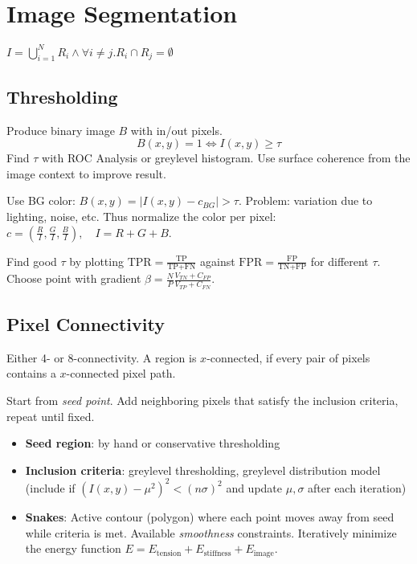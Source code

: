 \section{Image Segmentation}
\begin{definition}
  \(I = \bigcup_{i=1}^N R_i \land \forall i \neq j. R_i \cap R_j = \emptyset\)
\end{definition}

\subsection{Thresholding}

\begin{algorithm}[Thresholding]
  Produce binary image \(B\) with in/out pixels.
  \[B(x, y) = 1  \iff I(x, y) \geq \tau\]
  Find \(\tau\) with ROC Analysis or greylevel histogram. Use surface coherence from the image context to improve result.
\end{algorithm}

\begin{algorithm}[Chromakeying]
  Use BG color: \(B(x, y) = |I(x, y) - c_{BG}| > \tau\).
  Problem: variation due to lighting, noise, etc.
  Thus normalize the color per pixel: \(c = (\frac{R}{I}, \frac{G}{I}, \frac{B}{I}), \quad I = R + G + B\).
\end{algorithm}

\begin{definition}
  Find good \(\tau\) by plotting \(\text{TPR} = \frac{\text{TP}}{\text{TP} + \text{FN}}\) against \(\text{FPR} = \frac{\text{FP}}{\text{TN} + \text{FP}}\) for different \(\tau\). 
  Choose point with gradient \(\beta = \frac{N}{P} \frac{V_{TN} + C_{FP}}{V_{TP} + C_{FN}}\).
\end{definition}

\subsection{Pixel Connectivity}
Either 4- or 8-connectivity. A region is \(x\)-connected, if every pair of pixels contains a \(x\)-connected pixel path.

\begin{algorithm}
  Start from \textit{seed point}. Add neighboring pixels that satisfy the inclusion criteria, repeat until fixed.

  \begin{itemize}
    \item \textbf{Seed region}: by hand or conservative thresholding
    \item \textbf{Inclusion criteria}: greylevel thresholding, greylevel distribution model (include if \((I(x, y) - \mu^2)^2 < (n \sigma)^2\) and update \(\mu, \sigma\) after each iteration)
    \item \textbf{Snakes}: Active contour (polygon) where each point moves away from seed while criteria is met.
    Available \textit{smoothness} constraints.
    Iteratively minimize the energy function \(E = E_{\text{tension}} + E_{\text{stiffness}} + E_{\text{image}}\).
  \end{itemize}
\end{algorithm}

